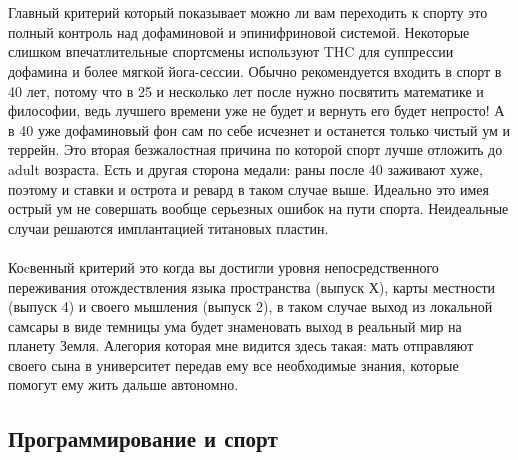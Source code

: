 \\
\\
Главный критерий который показывает можно ли вам переходить к спорту   это полный контроль над дофаминовой и эпинифриновой системой. Некоторые слишком впечатлительные спортсмены используют THC для суппрессии дофамина и более мягкой йога-сессии. Обычно рекомендуется входить в спорт в 40 лет, потому что в 25 и несколько лет после нужно посвятить математике и философии, ведь лучшего времени уже не будет и вернуть его будет непросто! А в 40 уже дофаминовый фон сам по себе исчезнет и останется только чистый ум и террейн. Это вторая безжалостная причина по которой спорт лучше отложить до adult возраста. Есть и другая сторона медали: раны после 40 заживают хуже, поэтому и ставки и острота и ревард в таком случае выше. Идеально   это имея острый ум не совершать вообще серьезных ошибок на пути спорта. Неидеальные случаи решаются имплантацией титановых пластин.
\\
\\
Коcвенный критерий   это когда вы достигли уровня непосредственного переживания отождествления языка пространства (выпуск Х), карты местности (выпуск 4) и своего мышления (выпуск 2), в таком случае выход из локальной самсары в виде темницы ума будет знаменовать выход в реальный мир на планету Земля. Алегория которая мне видится здесь такая: мать отправляют своего сына в университет передав ему все необходимые знания, которые помогут ему жить дальше автономно.

\subsection{Программирование и спорт}

